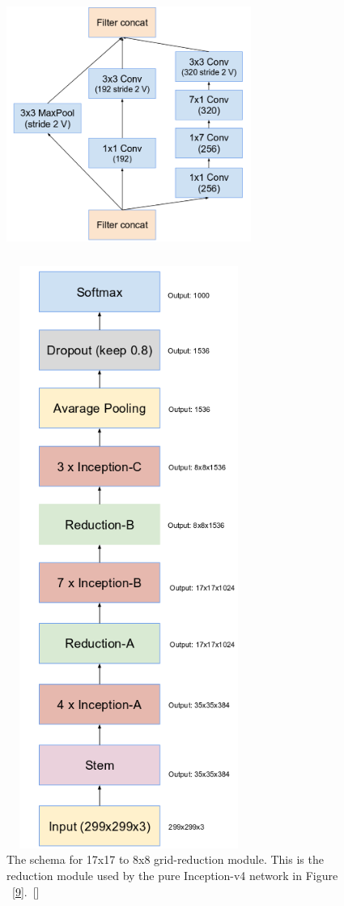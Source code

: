 \documentclass[a4paper,12pt, twoside]{NITKReport}
\begin{document}
\begin{figure}
\centering
\begin{minipage}[b]{0.4\textwidth}
    \includegraphics[height=9cm,width=8cm]{figure8.png}
    \caption{The schema for 17x17 to 8x8 grid-reduction module. This is the reduction module used by the pure Inception-v4 network in Figure ~\ref{9}.~[\cite{szegedy2017inception}]}
    \label{8}
  \end{minipage}
  \hfill
  \begin{minipage}[b]{0.4\textwidth}
 \includegraphics[height=19cm,width=8cm]{figure9.png}

\end{minipage}
\end{figure}
\end{document}
